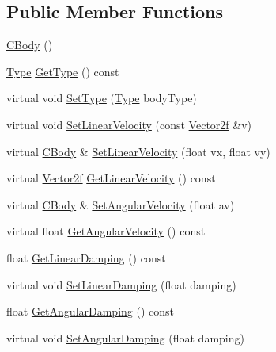 \subsection*{Public Member Functions}
\begin{DoxyCompactItemize}
\item 
\hyperlink{classastu_1_1suite2d_1_1CBody_adbd7ed8d654abbd79242f7979d31e2d0}{C\+Body} ()
\item 
\hyperlink{classastu_1_1suite2d_1_1CBody_a5731a8b9f24de5494683e4b7e8016b64}{Type} \hyperlink{classastu_1_1suite2d_1_1CBody_a78f429bf50e5ece567478212cad5e652}{Get\+Type} () const
\item 
virtual void \hyperlink{classastu_1_1suite2d_1_1CBody_a7bc4b66e64442095a7b5ef4c689e6ccd}{Set\+Type} (\hyperlink{classastu_1_1suite2d_1_1CBody_a5731a8b9f24de5494683e4b7e8016b64}{Type} body\+Type)
\item 
virtual void \hyperlink{classastu_1_1suite2d_1_1CBody_a6c05f3452c985e94b78e198ea8b78c98}{Set\+Linear\+Velocity} (const \hyperlink{classastu_1_1Vector2}{Vector2f} \&v)
\item 
virtual \hyperlink{classastu_1_1suite2d_1_1CBody}{C\+Body} \& \hyperlink{classastu_1_1suite2d_1_1CBody_a782e16301f7268e7a511df7cdf39e168}{Set\+Linear\+Velocity} (float vx, float vy)
\item 
virtual \hyperlink{classastu_1_1Vector2}{Vector2f} \hyperlink{classastu_1_1suite2d_1_1CBody_a210a80c6f3e024b98dd367a35415cc86}{Get\+Linear\+Velocity} () const
\item 
virtual \hyperlink{classastu_1_1suite2d_1_1CBody}{C\+Body} \& \hyperlink{classastu_1_1suite2d_1_1CBody_aa99d91083ba8072acab5d1d042882d8a}{Set\+Angular\+Velocity} (float av)
\item 
virtual float \hyperlink{classastu_1_1suite2d_1_1CBody_a8b29b3752942062468e9f91f6b72430d}{Get\+Angular\+Velocity} () const
\item 
float \hyperlink{classastu_1_1suite2d_1_1CBody_ac76f056ff08398c9057563e0d67a5f00}{Get\+Linear\+Damping} () const
\item 
virtual void \hyperlink{classastu_1_1suite2d_1_1CBody_a078a4f6dbcad8717341a7ebb861a8fb2}{Set\+Linear\+Damping} (float damping)
\item 
float \hyperlink{classastu_1_1suite2d_1_1CBody_a29017bd14847bdc5f8075de0a519938e}{Get\+Angular\+Damping} () const
\item 
virtual void \hyperlink{classastu_1_1suite2d_1_1CBody_ac0edc18b2988e0ea50466dd373a61856}{Set\+Angular\+Damping} (float damping)
\item 

\end{DoxyCompactItemize}
